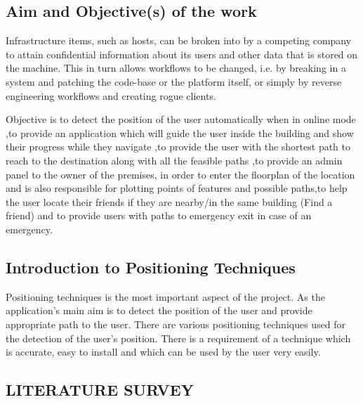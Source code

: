 \documentclass[a4paper, 12pt]{article}
\begin{document}
\subsection{Aim and Objective(s) of the work} 
\par Infrastructure items, such as hosts, can be broken into by a competing company to attain confidential information about its users and other data that is stored on the machine. This in turn allows workflows to be changed, i.e. by breaking in a system and patching the code-base or the platform itself, or simply by reverse engineering workflows and creating rogue clients.
\\
\par
Objective is to detect the position of the user automatically when in online mode ,to provide an application which will guide the user inside the building and show their progress while they navigate ,to provide the user with the shortest path to reach to the destination along with all the feasible paths ,to provide an admin panel to the owner of the premises, in order to enter the floorplan of the location and is also responsible for plotting points of features and possible paths,to help the user locate their friends if they are nearby/in the same building (Find a friend) and to provide users with paths to emergency exit in case of an emergency.
\\
\subsection{Introduction to Positioning Techniques	}
\par 
Positioning techniques is the most important aspect of the project. As the application’s main aim is to detect the position of the user and provide appropriate path to the user. There are various positioning techniques used for the detection of the user’s position. There is a requirement of a technique which is accurate, easy to install and which can be used by the user very easily.
\\
\newpage

\begin{center}

\section{LITERATURE SURVEY}

\end{center}
\end{document}
